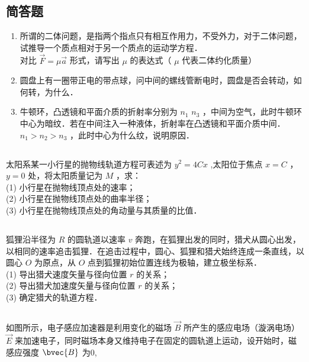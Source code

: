 \subsection{简答题}

\begin{enumerate}

\item 所谓的二体问题，是指两个指点只有相互作用力，不受外力，对于二体问题，试推导一个质点相对于另一个质点的运动学方程．\\
对比 $\vec{F} = \mu \vec{a}$ 形式，请写出 $\mu$ 的表达式（ $\mu$ 代表二体约化质量）

\item 圆盘上有一圈带正电的带点球，问中间的螺线管断电时，圆盘是否会转动，如何转，为什么．

\item 牛顿环，凸透镜和平面介质的折射率分别为 $n_{1}$ $n_{3}$ ，中间为空气，此时牛顿环中心为暗纹．若在中间注入一种液体，折射率在凸透镜和平面介质中间．$n_{1}>n_{2}>n_{3}$ ，此时中心为什么纹，说明原因．

\end{enumerate}

\subsection{ }
太阳系某一小行星的抛物线轨道方程可表述为 $y^{2} = 4Cx$ ,太阳位于焦点 $x = C$ ，$y = 0$ 处，将太阳质量记为 $M$ ，求：\\
(1) 小行星在抛物线顶点处的速率；\\
(2) 小行星在抛物线顶点处的曲率半径；\\
(3) 小行星在抛物线顶点处的角动量与其质量的比值．\\

\subsection{ }
狐狸沿半径为 $R$ 的圆轨道以速率 $v$ 奔跑，在狐狸出发的同时，猎犬从圆心出发，以相同的速率追击狐狸．在追击过程中，圆心、狐狸和猎犬始终连成一条直线，以圆心 $O$ 为原点，从 $O$ 点到狐狸初始位置连线为极轴，建立极坐标系．\\
(1) 导出猎犬速度矢量与径向位置 $r$ 的关系；\\
(2) 导出猎犬加速度矢量与径向位置 $r$ 的关系；\\
(3) 确定猎犬的轨道方程．

\subsection{ }
如图所示，电子感应加速器是利用变化的磁场 $\vec{B}$ 所产生的感应电场（漩涡电场） $\vec{E}$ 来加速电子，同时磁场本身又维持电子在固定的圆轨道上运动，设开始时，磁感应强度 $\bvec{B}$ 为0,